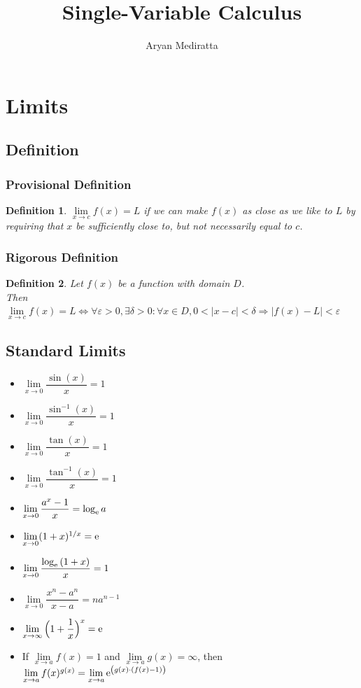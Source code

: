\documentclass[14]{article}
\newtheorem{define}{Definition}
\theoremstyle{definition}
\theoremstyle{case}
\begin{document}
\title{Single-Variable Calculus}
\author{Aryan Mediratta}
\maketitle
\tableofcontents
\pagebreak
\section{Limits}
\subsection{Definition}
\subsubsection{Provisional Definition}
\begin{define}
$\lim\limits_{x \to c} f(x) = L$ if we can make $f(x)$ as close as we like to $L$ by requiring that $x$ be sufficiently close to, but not necessarily equal to $c$.
\end{define}
\subsubsection{Rigorous Definition}
\begin{define}
Let $f(x)$ be a function with domain $D$.\\
Then $\lim\limits_{x \to c} f(x) = L \Leftrightarrow \forall \varepsilon > 0, \exists \delta > 0:\forall x \in D, 0 < |x-c| < \delta \Rightarrow |f(x)-L| < \varepsilon$
\end{define}
\subsection{Standard Limits}
\begin{itemize}
\item $\lim\limits_{x \to 0} \dfrac{\sin(x)}{x} = 1$
\item $\lim\limits_{x \to 0} \dfrac{\sin^{-1}(x)}{x} = 1$
\item $\lim\limits_{x \to 0} \dfrac{\tan(x)}{x} = 1$
\item $\lim\limits_{x \to 0} \dfrac{\tan^{-1}(x)}{x} = 1$
\item $\lim\limits_{x \to 0} \dfrac{a^x - 1}{x} = \log_{\rm e}{a}$
\item $\lim\limits_{x \to 0} (1+x)^{1/x} ={\rm e}$
\item $\lim\limits_{x \to 0} \dfrac{\log_{\rm e}{(1+x)}}{x} = 1$
\item $\lim\limits_{x \to 0} \dfrac{x^n - a^n}{x-a} = na^{n-1}$
\item $\lim\limits_{x \to \infty} \Big(1 + \dfrac{1}{x}\Big)^x ={\rm e}$
\item If $\lim\limits_{x \to a} f(x) = 1$ and $\lim\limits_{x \to a} g(x) = \infty$, then $\lim\limits_{x \to a} f(x)^{g(x)} = \lim\limits_{x \to a} {\rm e}^{\left(g(x) \cdot (f(x) - 1)\right)}$
\end{itemize}
\end{document}
